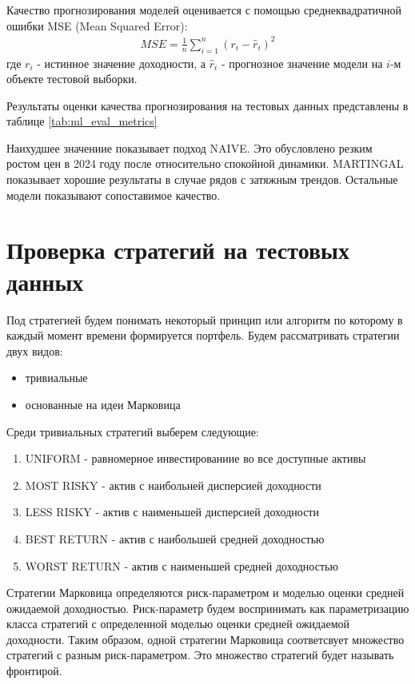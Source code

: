 Качество прогнозирования моделей оценивается с помощью среднеквадратичной ошибки MSE (Mean Squared Error):
\begin{align}
	MSE = \frac{1}{n} \sum_{i=1}^{n} (r_i - \hat{r}_i)^2
\end{align}
где $r_i$ - истинное значение доходности,
а $\hat{r}_i$ - прогнозное значение модели на $i$-м объекте тестовой выборки.

Результаты оценки качества прогнозирования на тестовых данных представлены в таблице \ref{tab:ml_eval_metrics}



Наихудшее значениие показывает подход NAIVE.
Это обусловлено резким ростом цен в 2024 году после относительно спокойной динамики.
MARTINGAL показывает хорошие результаты в случае рядов с затяжным трендов.
Остальные модели показывают сопоставимое качество.

\section{Проверка стратегий на тестовых данных}

Под стратегией будем понимать некоторый принцип или алгоритм по которому в каждый момент времени
формируется портфель.
Будем рассматривать стратегии двух видов:
\begin{itemize}
	\item тривиальные 
	\item основанные на идеи Марковица
\end{itemize}

Среди тривиальных стратегий выберем следующие:
\begin{enumerate}
	\item UNIFORM - равномерное инвестированиие во все доступные активы
	\item MOST RISKY - актив с наибольней дисперсией доходности
	\item LESS RISKY - актив с наименьшей дисперсией доходности
	\item BEST RETURN - актив с наибольшей средней доходностью
	\item WORST RETURN - актив с наименьшей средней доходностью
\end{enumerate}

Стратегии Марковица определяются риск-параметром и моделью оценки средней ожидаемой доходностью.
Риск-параметр будем воспринимать как параметризацию класса стратегий с определенной моделью оценки средней ожидаемой доходности.
Таким образом, одной стратегии Марковица соответсвует множество стратегий с разным риск-параметром. 
Это множество стратегий будет называть фронтирой.

